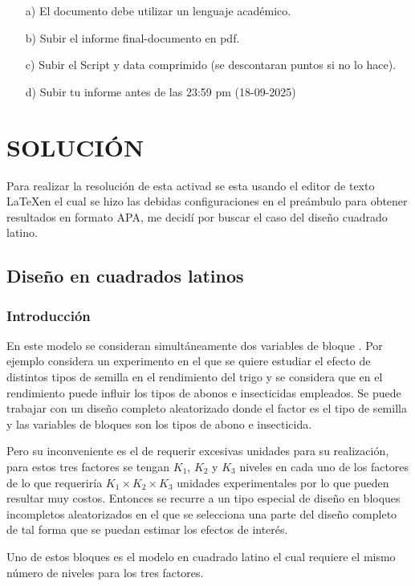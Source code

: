 \begin{itemize}
  \item[a)] El documento debe utilizar un lenguaje académico.
  \item[b)] Subir el informe final-documento en pdf.
  \item[c)] Subir el Script y data comprimido (se descontaran puntos si no lo hace).
  \item[d)] Subir tu informe antes de las 23:59 pm (18-09-2025)
\end{itemize}

\section{SOLUCIÓN}

Para realizar la resolución de esta activad se esta usando el editor de texto \LaTeX en el cual se hizo las debidas configuraciones en el preámbulo para obtener resultados en formato APA, me decidí por buscar el caso del diseño cuadrado latino.

\subsection{Diseño en cuadrados latinos}

\subsubsection{Introducción}

En este modelo se consideran simultáneamente dos variables de bloque \citep{ugr_latinos}. Por ejemplo considera un experimento en el que se quiere estudiar el efecto de distintos tipos de semilla en el rendimiento del trigo y se considera que en el rendimiento puede influir los tipos de abonos e insecticidas empleados. Se puede trabajar con un diseño completo aleatorizado donde el factor es el tipo de semilla y las variables de bloques son los tipos de abono e insecticida.

Pero su inconveniente es el de requerir excesivas unidades para su realización, para estos tres factores se tengan $K_1$, $K_2$ y $K_3$ niveles en cada uno de los factores de lo que requeriría $K_1 \times K_2 \times K_3$ unidades experimentales por lo que pueden resultar muy costos. Entonces se recurre a un tipo especial de diseño en bloques incompletos aleatorizados en el que se selecciona una parte del diseño completo de tal forma que se puedan estimar los efectos de interés.

Uno de estos bloques es el modelo en cuadrado latino el cual requiere el mismo número de niveles para los tres factores.

